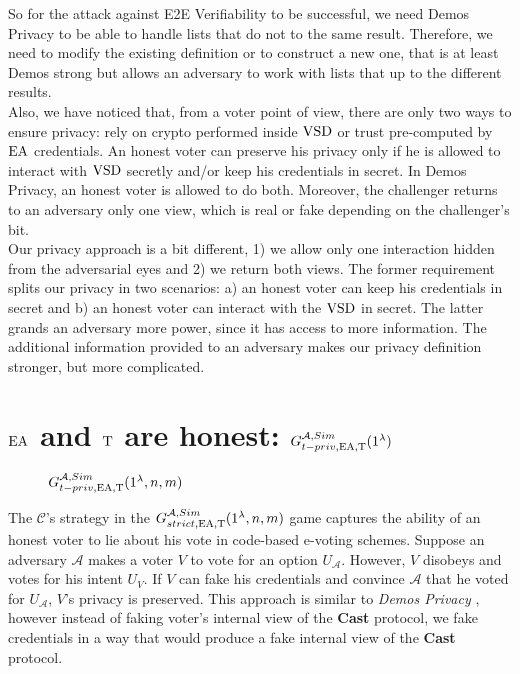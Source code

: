 So for the attack against E2E Verifiability to be successful, we need Demos Privacy to be able to handle lists that do not  to the same result. Therefore, we need to modify the existing definition or to construct a new one, that is at least Demos strong but allows an adversary to work with lists that  up to the different results.\\

Also, we have noticed that, from a voter point of view, there are only two ways to ensure privacy: rely on crypto performed inside $\operatorname{VSD}$ or trust pre-computed by $\operatorname{EA}$ credentials. An honest voter can preserve his privacy only if he is allowed to interact with $\operatorname{VSD}$ secretly and/or keep his credentials in secret.  In Demos Privacy, an honest voter is allowed to do both. Moreover, the challenger returns to an adversary only one view, which is real or fake depending on the challenger's bit.\\

 Our privacy approach is a bit different, 1) we allow only one interaction hidden from the adversarial eyes and 2) we return both views. The former requirement splits our privacy in two scenarios: a) an honest voter can keep his credentials in secret and b) an honest voter can interact with the $\operatorname{VSD}$ in secret. The latter grands an adversary more power, since it has access to more information. The additional information provided to an adversary makes our privacy definition stronger, but more complicated. 
 \section{$\operatorname{EA}$ and $\operatorname{T}$ are honest: $G_{t-priv,\operatorname{EA},\operatorname{T}}^{\mathcal{A}, Sim}(1^{\lambda})$}
  \begin{figure}[ht!]
 
        \caption{  $G_{t-priv,\operatorname{EA},\operatorname{T}}^{\mathcal{A}, Sim}(1^{\lambda},n,m)$}
\end{figure}

The  $\mathcal{C}$'s strategy  in the  $G_{strict,\operatorname{EA},\operatorname{T}}^{\mathcal{A}, Sim}(1^{\lambda},n,m)$ game captures the ability of an honest voter to lie about his vote in code-based e-voting schemes. Suppose an adversary $\mathcal{A}$ makes a voter $V$ to vote for an option $U_{\mathcal{A}}$.  However, $V$ disobeys and votes for his intent $U_{V}$. If $V$ can fake his credentials  and convince $\mathcal{A}$ that he voted for $U_{\mathcal{A}}$, $V$'s privacy is preserved. This approach is similar to \textit{Demos Privacy} \cite{Kiayias2015}, however instead of faking voter's internal view of the \textbf{Cast} protocol, we fake credentials in a way that would produce a fake internal view of the \textbf{Cast} protocol.\\

